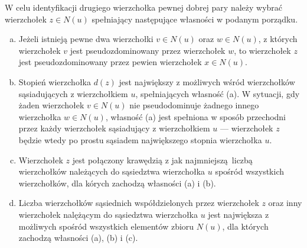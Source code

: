 {\begin{definition}
    W celu identyfikacji drugiego wierzchołka pewnej dobrej pary należy wybrać wierzchołek $z \in N(u)$ spełniający następujące własności w podanym porządku.
    \begin{enumerate}[(a)]
      \item Jeżeli istnieją pewne dwa wierzchołki $v \in N(u)$ oraz $w \in N(u)$, z których wierzchołek $v$ jest pseudozdominowany przez wierzchołek $w$, to wierzchołek $z$ jest pseudozdominowany przez pewien wierzchołek $x \in N(u)$.
      \item Stopień wierzchołka $d(z)$ jest największy z możliwych wśród wierzchołków sąsiadujących z wierzchołkiem $u$, spełniających własność (a).
      W sytuacji, gdy żaden wierzchołek $v \in N(u)$ nie pseudodominuje żadnego innego wierzchołka $w \in N(u)$, własność (a) jest spełniona w sposób przechodni przez każdy wierzchołek sąsiadujący z wierzchołkiem $u$ --- wierzchołek $z$ będzie wtedy po prostu sąsiadem największego stopnia wierzchołka $u$.
      \item Wierzchołek $z$ jest połączony krawędzią z jak najmniejszą liczbą wierzchołków należących do sąsiedztwa wierzchołka $u$ spośród wszystkich wierzchołków, dla kórych zachodzą własności (a) i (b).
      \item Liczba wierzchołków sąsiednich współdzielonych przez wierzchołek $z$ oraz inny wierzchołek nalężącym do sąsiedztwa wierzchołka $u$ jest największa z możliwych spośród wszystkich elementów zbioru $N(u)$, dla których zachodzą własności (a), (b) i (c).
    \end{enumerate}
  \end{definition}
}

